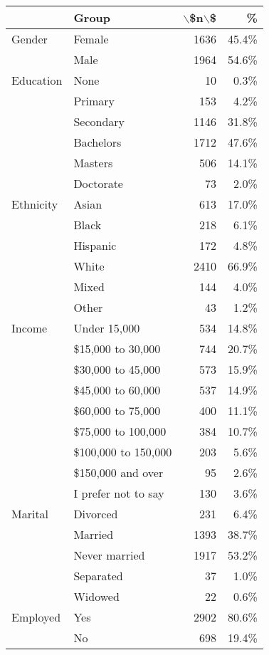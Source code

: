 \begin{table*}[t]
\centering
\begin{tabular}{llrr}
\toprule
  & Group & $\backslash$\$n$\backslash$\$ & \% \\ 
  \midrule
Gender & Female & 1636 & 45.4\% \\ 
   & Male & 1964 & 54.6\% \\ 
  Education & None &  10 &  0.3\% \\ 
   & Primary & 153 &  4.2\% \\ 
   & Secondary & 1146 & 31.8\% \\ 
   & Bachelors & 1712 & 47.6\% \\ 
   & Masters & 506 & 14.1\% \\ 
   & Doctorate &  73 &  2.0\% \\ 
  Ethnicity & Asian & 613 & 17.0\% \\ 
   & Black & 218 &  6.1\% \\ 
   & Hispanic & 172 &  4.8\% \\ 
   & White & 2410 & 66.9\% \\ 
   & Mixed & 144 &  4.0\% \\ 
   & Other &  43 &  1.2\% \\ 
  Income & Under 15,000 & 534 & 14.8\% \\ 
   & \$15,000 to 30,000 & 744 & 20.7\% \\ 
   & \$30,000 to 45,000 & 573 & 15.9\% \\ 
   & \$45,000 to 60,000 & 537 & 14.9\% \\ 
   & \$60,000 to 75,000 & 400 & 11.1\% \\ 
   & \$75,000 to 100,000 & 384 & 10.7\% \\ 
   & \$100,000 to 150,000 & 203 &  5.6\% \\ 
   & \$150,000 and over &  95 &  2.6\% \\ 
   & I prefer not to say & 130 &  3.6\% \\ 
  Marital & Divorced & 231 &  6.4\% \\ 
   & Married & 1393 & 38.7\% \\ 
   & Never married & 1917 & 53.2\% \\ 
   & Separated &  37 &  1.0\% \\ 
   & Widowed &  22 &  0.6\% \\ 
  Employed & Yes & 2902 & 80.6\% \\ 
   & No & 698 & 19.4\% \\ 

\end{tabular}
\end{table*}
